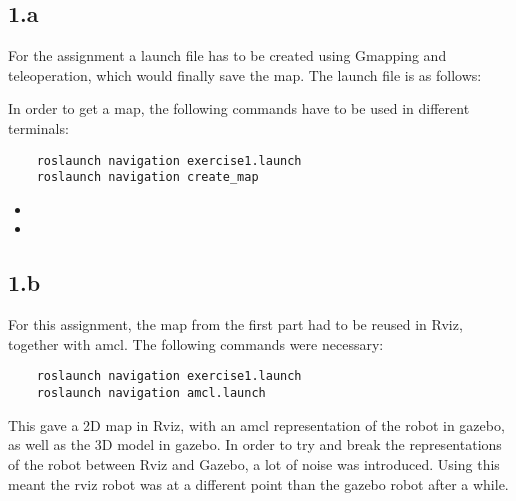 
\subsection*{1.a}
For the assignment a launch file has to be created using Gmapping and teleoperation, which would finally save the map. The launch file is as follows:



In order to get a map, the following commands have to be used in different terminals:

\begin{lstlisting}
	roslaunch navigation exercise1.launch
	roslaunch navigation create_map
\end{lstlisting}

\begin{itemize}
	\item {}
	\item {}
\end{itemize}


\subsection*{1.b}


For this assignment, the map from the first part had to be reused in Rviz, together with amcl. The following commands were necessary:

\begin{lstlisting}
	roslaunch navigation exercise1.launch
	roslaunch navigation amcl.launch
\end{lstlisting}

This gave a 2D map in Rviz, with an amcl representation of the robot in gazebo, as well as the 3D model in gazebo. In order to try and break the representations of the robot between Rviz and Gazebo, a lot of noise was introduced. Using this meant the rviz robot was at a different point than the gazebo robot after a while.



